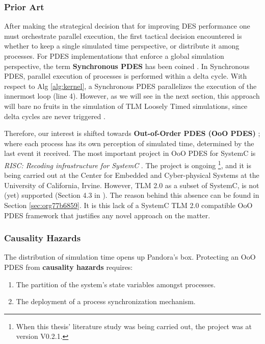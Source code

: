 \documentclass[11pt]{article}
\begin{document}
\subsubsection{Prior Art}
\label{sec:orge7b4ee6}
After making the strategical decision that for improving DES performance one must orchestrate parallel execution, the first tactical decision encountered is whether to keep a single simulated time perspective, or distribute it among processes.
For PDES implementations that enforce a global simulation perspective, the term \textbf{Synchronous PDES} has been coined \cite{Schumacher2010} \cite{Moy}.
In Synchronous PDES, parallel execution of processes is performed within a delta cycle. 
With respect to Alg \ref{alg:kernel}, a Synchronous PDES parallelizes the execution of the innermost loop (line 4).
However, as we will see in the next section, this approach will bare no fruits in the simulation of TLM Loosely Timed simulations, since delta cycles are never triggered \cite{Chen2012}.

Therefore, our interest is shifted towards \textbf{Out-of-Order PDES (OoO PDES)} \cite{Chen2015};  where each process has its own perception of simulated time, determined by the last event it received.
The most important project in OoO PDES for SystemC is \textit{RISC: Recoding infrastructure for SystemC} \cite{Liu2015}.
The project is ongoing \footnote{When this thesis' literature study was being carried out, the project was at version V0.2.1.}, and it is being carried out at the Center for Embedded and Cyber-physical Systems at the University of California, Irvine.
However, TLM 2.0 as a subset of SystemC, is not (yet) supported (Section 4.3 in \cite{Liu2015}).
The reason behind this absence can be found in Section \ref{sec:org77b6859}.
It is this lack of a SystemC TLM 2.0 compatible OoO PDES framework that justifies any novel approach on the matter.

\subsubsection{Causality Hazards}
\label{sec:org4eed10d}
The distribution of simulation time opens up Pandora's box.
Protecting an OoO PDES from \textbf{causality hazards} requires:
\begin{enumerate}
\item The partition of the system's state variables amongst processes.
\item The deployment of a process synchronization mechanism.
\end{enumerate}
\end{document}
